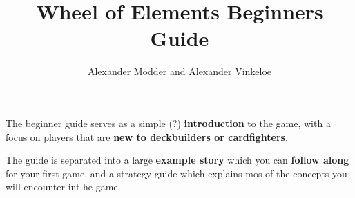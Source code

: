 \documentclass[english,10pt,a4paper]{article}
\title{\textbf {Wheel of Elements} Beginners Guide}
\author{Alexander Mödder and Alexander Vinkeloe}
\begin{document}
\maketitle

\begin{minipage}[t][12cm][t]{0.5\textwidth}
	The beginner guide serves as a simple (?) \textbf{introduction} to the game, with a focus on players that are \textbf{new to deckbuilders or cardfighters}.
	
	The guide is separated into a large \textbf{example story} which you can \textbf{follow along} for your first game, and a strategy guide which explains mos of the concepts you will encounter int he game.
\end{minipage}
\begin{minipage}[t][12cm][t]{0.5\textwidth}
	\setlength{\cftbeforetoctitleskip}{-0.5em}
	\setlength{\cftbeforesecskip}{0em}
	\tableofcontents
	
\end{minipage}


\newpage



\newpage


\end{document}

